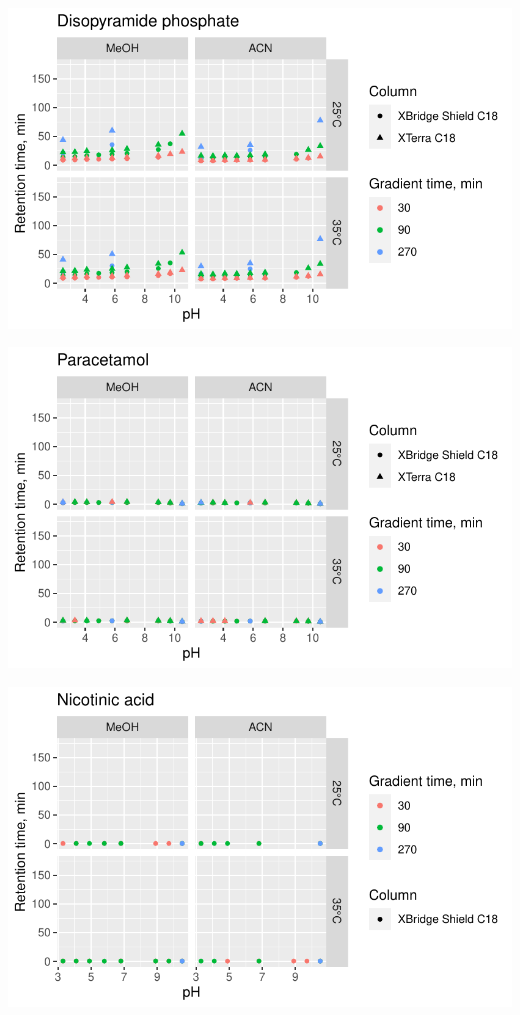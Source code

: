 \documentclass[
  letterpaper,
  DIV=11,
  numbers=noendperiod]{scrreprt}
\begin{document}
\includegraphics{index_files/figure-pdf/unnamed-chunk-4-66.pdf}

\includegraphics{index_files/figure-pdf/unnamed-chunk-4-67.pdf}

\includegraphics{index_files/figure-pdf/unnamed-chunk-4-68.pdf}
\end{document}
